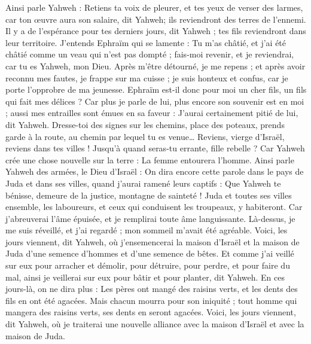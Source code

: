 \begin{multicols}{2}
Ainsi parle Yahweh : Retiens ta voix de pleurer, et tes yeux de verser des larmes, car ton œuvre aura son salaire, dit Yahweh; ils reviendront des terres de l'ennemi.
Il y a de l'espérance pour tes derniers jours, dit Yahweh ; tes fils reviendront dans leur territoire.
J'entends Ephraïm qui se lamente : Tu m'as châtié, et j'ai été châtié comme un veau qui n'est pas dompté ; fais-moi revenir, et je reviendrai, car tu es Yahweh, mon Dieu.
Après m'être détourné, je me repens ; et après avoir reconnu mes fautes, je frappe sur ma cuisse ; je suis honteux et confus, car je porte l'opprobre de ma jeunesse.
Ephraïm est-il donc pour moi un cher fils, un fils qui fait mes délices ? Car plus je parle de lui, plus encore son souvenir est en moi ; aussi mes entrailles sont émues en sa faveur : J'aurai certainement pitié de lui, dit Yahweh.
Dresse-toi des signes sur les chemins, place des poteaux, prends garde à la route, au chemin par lequel tu es venue… Reviens, vierge d'Israël, reviens dans tes villes !
Jusqu'à quand seras-tu errante, fille rebelle ? Car Yahweh crée une chose nouvelle sur la terre : La femme entourera l'homme.
Ainsi parle Yahweh des armées, le Dieu d'Israël : On dira encore cette parole dans le pays de Juda et dans ses villes, quand j'aurai ramené leurs captifs : Que Yahweh te bénisse, demeure de la justice, montagne de sainteté !
Juda et toutes ses villes ensemble, les laboureurs, et ceux qui conduisent les troupeaux, y habiteront.
Car j'abreuverai l'âme épuisée, et je remplirai toute âme languissante.
Là-dessus, je me suis réveillé, et j'ai regardé ; mon sommeil m'avait été agréable.
Voici, les jours viennent, dit Yahweh, où j'ensemencerai la maison d'Israël et la maison de Juda d'une semence d'hommes et d'une semence de bêtes.
Et comme j'ai veillé sur eux pour arracher et démolir, pour détruire, pour perdre, et pour faire du mal, ainsi je veillerai sur eux pour bâtir et pour planter, dit Yahweh.
En ces jours-là, on ne dira plus : Les pères ont mangé des raisins verts, et les dents des fils en ont été agacées.
Mais chacun mourra pour son iniquité ; tout homme qui mangera des raisins verts, ses dents en seront agacées.
Voici, les jours viennent, dit Yahweh, où je traiterai une nouvelle alliance avec la maison d'Israël et avec la maison de Juda.

\end{multicols}
